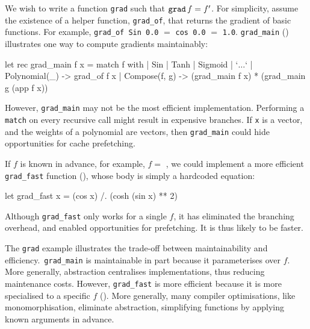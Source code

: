 We wish to write a function \texttt{grad} such that $\text{\texttt{grad}} \, f = f'$. For simplicity, assume the existence of a helper function, \texttt{grad_of}, that returns the gradient of basic functions. For example, \texttt{grad_of Sin 0.0} $=$ \texttt{cos 0.0} $=$ \texttt{1.0}. \texttt{grad_main} () illustrates one way to compute gradients maintainably: 

\begin{code}
\begin{ocamllst}
let rec grad_main f x = match f with
  | Sin
  | Tanh
  | Sigmoid
  | `$\ldots$`
  | Polynomial(_) -> grad_of f x 
  | Compose(f, g) -> (grad_main f x) * (grad_main g (app f x))
\end{ocamllst}
\label{listing:ocaml-grad-main}
\end{code}

However, \texttt{grad_main} may not be the most efficient implementation. Performing a \texttt{match} on every recursive call might result in expensive branches. If \texttt{x} is a vector, and the weights of a polynomial are vectors, then \texttt{grad_main} could hide opportunities for cache prefetching.

If $f$ is known in advance, for example, $f =$ , we could implement a more efficient \texttt{grad_fast} function (), whose body is simply a hardcoded equation:

\begin{code}
\begin{ocamllst}
let grad_fast x = (cos x) /. (cosh (sin x) ** 2)
\end{ocamllst}
\label{listing:ocaml-grad-fast}
\end{code}    

Although \texttt{grad_fast} only works for a single $f$, it has eliminated the branching overhead, and enabled opportunities for prefetching. It is thus likely to be faster.

The \texttt{grad} example illustrates the trade-off between maintainability and efficiency.\ \texttt{grad_main} is maintainable in part because it parameterises over $f$. More generally, abstraction centralises implementations, thus reducing maintenance costs. However, \texttt{grad_fast} is more efficient because it is more specialised to a specific $f$ (). More generally, many compiler optimisations, like monomorphisation, eliminate abstraction, simplifying functions by applying known arguments in advance. 

